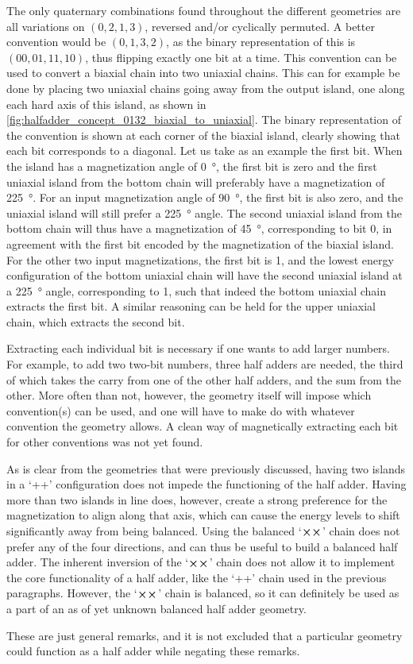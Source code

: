 \documentclass[11pt,a4paper,english]{article}
\begin{document}
The only quaternary combinations found throughout the different geometries are all variations on $(0,2,1,3)$, reversed and/or cyclically permuted. A better convention would be $(0,1,3,2)$, as the binary representation of this is $(00, 01, 11, 10)$, thus flipping exactly one bit at a time. This convention can be used to convert a biaxial chain into two uniaxial chains. This can for example be done by placing two uniaxial chains going away from the output island, one along each hard axis of this island, as shown in \cref{fig:halfadder_concept_0132_biaxial_to_uniaxial}. The binary representation of the convention is shown at each corner of the biaxial island, clearly showing that each bit corresponds to a diagonal. Let us take as an example the first bit. When the island has a magnetization angle of \SI{0}{\degree}, the first bit is zero and the first uniaxial island from the bottom chain will preferably have a magnetization of \SI{225}{\degree}. For an input magnetization angle of \SI{90}{\degree}, the first bit is also zero, and the uniaxial island will still prefer a \SI{225}{\degree} angle. The second uniaxial island from the bottom chain will thus have a magnetization of \SI{45}{\degree}, corresponding to bit 0, in agreement with the first bit encoded by the magnetization of the biaxial island. For the other two input magnetizations, the first bit is 1, and the lowest energy configuration of the bottom uniaxial chain will have the second uniaxial island at a \SI{225}{\degree} angle, corresponding to 1, such that indeed the bottom uniaxial chain extracts the first bit. A similar reasoning can be held for the upper uniaxial chain, which extracts the second bit. \par
Extracting each individual bit is necessary if one wants to add larger numbers. For example, to add two two-bit numbers, three half adders are needed, the third of which takes the carry from one of the other half adders, and the sum from the other. More often than not, however, the geometry itself will impose which convention(s) can be used, and one will have to make do with whatever convention the geometry allows. A clean way of magnetically extracting each bit for other conventions was not yet found. \par
As is clear from the geometries that were previously discussed, having two islands in a `++' configuration does not impede the functioning of the half adder. Having more than two islands in line does, however, create a strong preference for the magnetization to align along that axis, which can cause the energy levels to shift significantly away from being balanced. Using the balanced `$\cross \cross$' chain does not prefer any of the four directions, and can thus be useful to build a balanced half adder. The inherent inversion of the `$\cross \cross$' chain does not allow it to implement the core functionality of a half adder, like the `++' chain used in the previous paragraphs. However, the `$\cross \cross$' chain is balanced, so it can definitely be used as a part of an as of yet unknown balanced half adder geometry. \par
These are just general remarks, and it is not excluded that a particular geometry could function as a half adder while negating these remarks.
\end{document}
